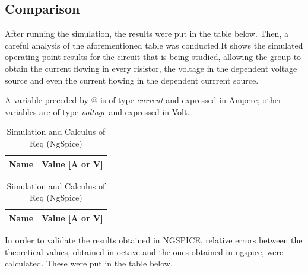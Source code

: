 \subsection{Comparison}
After running the simulation, the results were put in the table below. Then, a careful analysis of the aforementioned table was conducted.It shows the simulated operating point results for the circuit that is being studied, allowing the group to obtain the current flowing in every risistor, the voltage in the dependent voltage source and even the current flowing in the dependent currrent source. 

A variable preceded by @ is of type {\em current} and expressed in Ampere; other variables are of type {\it voltage} and expressed in
    Volt.
\begin{table}[ht]
\parbox{.45\linewidth}{
  \centering
  \begin{tabular}{|l|r|}
    \hline    
    {\bf Name} & {\bf Value [A or V]} \\ \hline
    
  \end{tabular}
  \caption{Simulation and Calculus of Req (NgSpice)}} 
\parbox{.45\linewidth}{
  \centering
  \begin{tabular}{|l|r|}
    \hline    
    {\bf Name} & {\bf Value [A or V]} \\ \hline
    
  \end{tabular}
  \caption{Simulation and Calculus of Req (NgSpice)}}
 
\end{table}


In order to validate the results obtained in NGSPICE, relative errors between the theoretical values, obtained in octave and the ones obtained in ngspice, were calculated. These were put in the table below.







